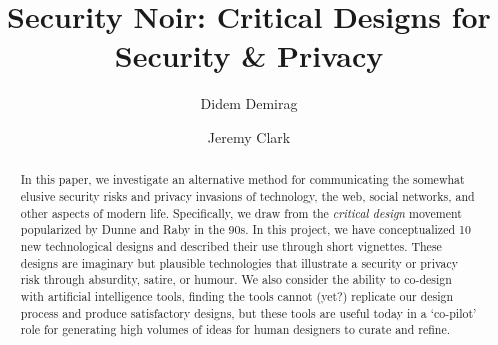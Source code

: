\documentclass[manuscript]{acmart}
\begin{document}
\title{Security Noir: Critical Designs for Security \& Privacy}

\author{Didem Demirag}


\author{Jeremy Clark}

\begin{abstract}

In this paper, we investigate an alternative method for communicating the somewhat elusive security risks and privacy invasions of technology, the web, social networks, and other aspects of modern life. Specifically, we draw from the \textit{critical design} movement popularized by Dunne and Raby in the 90s. In this project, we have conceptualized 10 new technological designs and described their use through short vignettes. These designs are imaginary but plausible technologies that illustrate a security or privacy risk through absurdity, satire, or humour. We also consider the ability to co-design with artificial intelligence tools, finding the tools cannot (yet?) replicate our design process and produce satisfactory designs, but these tools are useful today in a `co-pilot' role for generating high volumes of ideas for human designers to curate and refine. 

\end{abstract}

\maketitle






%
%
%




\end{document}
